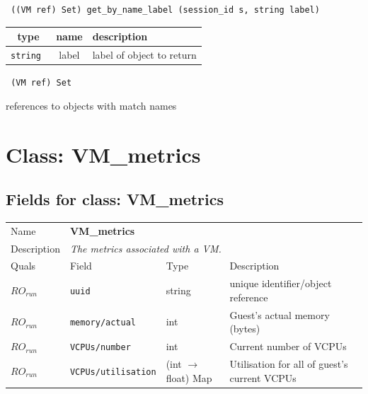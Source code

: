 \begin{verbatim} ((VM ref) Set) get_by_name_label (session_id s, string label)\end{verbatim}



 
\vspace{0.3cm}
\begin{tabular}{|c|c|p{7cm}|}
 \hline
{\bf type} & {\bf name} & {\bf description} \\ \hline
{\tt string } & label & label of object to return \\ \hline 

\end{tabular}

\vspace{0.3cm}

{\tt 
(VM ref) Set
}


references to objects with match names
\vspace{0.3cm}
\vspace{0.3cm}
\vspace{0.3cm}

\vspace{1cm}
\newpage
\section{Class: VM\_metrics}
\subsection{Fields for class: VM\_metrics}
\begin{longtable}{|lllp{}|}
\hline
\multicolumn{1}{|l}{Name} & \multicolumn{3}{l|}{\bf VM\_metrics} \\
\multicolumn{1}{|l}{Description} & \multicolumn{3}{l|}{\parbox{11cm}{\em
The metrics associated with a VM.}} \\
\hline
Quals & Field & Type & Description \\
\hline
$\mathit{RO}_\mathit{run}$ &  {\tt uuid} & string & unique identifier/object reference \\
$\mathit{RO}_\mathit{run}$ &  {\tt memory/actual} & int & Guest's actual memory (bytes) \\
$\mathit{RO}_\mathit{run}$ &  {\tt VCPUs/number} & int & Current number of VCPUs \\
$\mathit{RO}_\mathit{run}$ &  {\tt VCPUs/utilisation} & (int $\rightarrow$ float) Map & Utilisation for all of guest's current VCPUs \\
\hline
\end{longtable}
